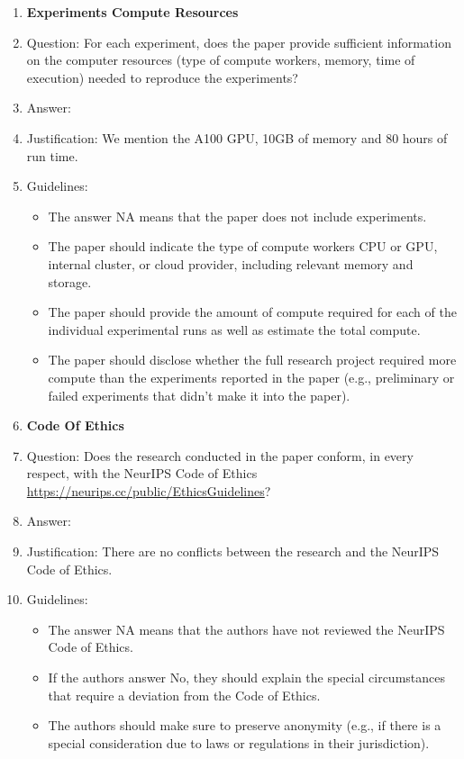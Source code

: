 \documentclass{article}
\begin{document}
\begin{enumerate}
\item {\bf Experiments Compute Resources}
    \item[] Question: For each experiment, does the paper provide sufficient information on the computer resources (type of compute workers, memory, time of execution) needed to reproduce the experiments?
    \item[] Answer: \answerYes{} %
    \item[] Justification: We mention the A100 GPU, 10GB of memory and 80 hours of run time. 
    \item[] Guidelines:
    \begin{itemize}
        \item The answer NA means that the paper does not include experiments.
        \item The paper should indicate the type of compute workers CPU or GPU, internal cluster, or cloud provider, including relevant memory and storage.
        \item The paper should provide the amount of compute required for each of the individual experimental runs as well as estimate the total compute. 
        \item The paper should disclose whether the full research project required more compute than the experiments reported in the paper (e.g., preliminary or failed experiments that didn't make it into the paper). 
    \end{itemize}
    
\item {\bf Code Of Ethics}
    \item[] Question: Does the research conducted in the paper conform, in every respect, with the NeurIPS Code of Ethics \url{https://neurips.cc/public/EthicsGuidelines}?
    \item[] Answer: \answerYes{} %
    \item[] Justification: There are no conflicts between the research and the NeurIPS Code of Ethics.
    \item[] Guidelines:
    \begin{itemize}
        \item The answer NA means that the authors have not reviewed the NeurIPS Code of Ethics.
        \item If the authors answer No, they should explain the special circumstances that require a deviation from the Code of Ethics.
        \item The authors should make sure to preserve anonymity (e.g., if there is a special consideration due to laws or regulations in their jurisdiction).
    \end{itemize}



\end{enumerate}
\end{document}
